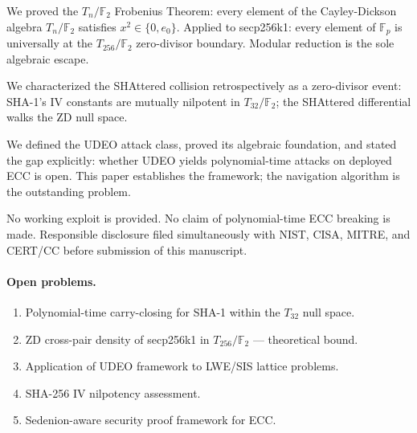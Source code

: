 \documentclass[runningheads]{llncs}
\theoremstyle{plain}
\theoremstyle{definition}
\newcommand{\GFtwo}{\mathbb{F}_2}
\begin{document}
We proved the $T_n/\GFtwo$ Frobenius Theorem: every element of the
Cayley-Dickson algebra $T_n/\GFtwo$ satisfies $x^2 \in \{0, e_0\}$.
Applied to secp256k1: every element of $\mathbb{F}_p$ is universally at the
$T_{256}/\GFtwo$ zero-divisor boundary. Modular reduction is the sole
algebraic escape.

We characterized the SHAttered collision retrospectively as a zero-divisor
event: SHA-1's IV constants are mutually nilpotent in $T_{32}/\GFtwo$;
the SHAttered differential walks the ZD null space.

We defined the UDEO attack class, proved its algebraic foundation,
and stated the gap explicitly: whether UDEO yields polynomial-time
attacks on deployed ECC is open. This paper establishes the framework;
the navigation algorithm is the outstanding problem.

No working exploit is provided. No claim of polynomial-time ECC breaking
is made. Responsible disclosure filed simultaneously with NIST, CISA,
MITRE, and CERT/CC before submission of this manuscript.

\paragraph{Open problems.}
\begin{enumerate}
\item Polynomial-time carry-closing for SHA-1 within the $T_{32}$ null space.
\item ZD cross-pair density of secp256k1 in $T_{256}/\GFtwo$ — theoretical bound.
\item Application of UDEO framework to LWE/SIS lattice problems.
\item SHA-256 IV nilpotency assessment.
\item Sedenion-aware security proof framework for ECC.
\end{enumerate}
\end{document}
